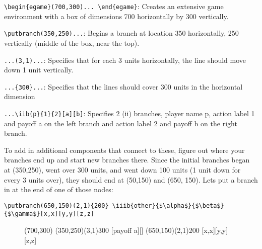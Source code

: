 \documentclass[10.5pt]{article}
\begin{document}
\begin{compactitem}
\item \verb+\begin{egame}(700,300)... \end{egame}+: Creates an extensive game environment with a box of dimensions 700 horizontally by 300 vertically.
\item \verb+\putbranch(350,250)...+: Begins a branch at location 350 horizontally, 250 vertically (middle of the box, near the top).
\item \verb+...(3,1)...+: Specifies that for each 3 units horizontally, the line should move down 1 unit vertically.
\item \verb+...{300}...+: Specifies that the lines should cover 300 units in the horizontal dimension
\item \verb+...\iib{p}{1}{2}[a][b]+: Specifies 2 (ii) branches, player name p, action label 1 and payoff a on the left branch and action label 2 and payoff b on the right branch. \\
\end{compactitem}

\clearpage

To add in additional components that connect to these, figure out where your branches end up and start new branches there.  Since the initial branches began at (350,250), went over 300 units, and went down 100 units (1 unit down for every 3 units over), they should end at (50,150) and (650, 150).  Lets put a branch in at the end of one of those nodes:
\begin{verbatim}
\putbranch(650,150)(2,1){200} \iiib{other}{$\alpha$}{$\beta$}{$\gamma$}[x,x][y,y][z,z]
\end{verbatim}


\begin{figure}[h]
\begin{footnotesize}
\begin{center}
\begin{egame}(700,300)
\putbranch(350,250)(3,1){300} [payoff a][]
\putbranch(650,150)(2,1){200} [x,x][y,y][z,z]
\end{egame}
\end{center}
\end{footnotesize}
\end{figure}

\end{document}
